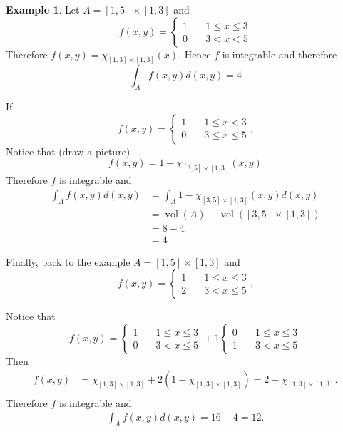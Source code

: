 \documentclass[11pt,openany]{book}
\theoremstyle{plain}
\theoremstyle{definition}
\newtheorem{example}{Example}[chapter]
\theoremstyle{remark}
\newcommand{\vol}{\operatorname{vol}}
\begin{document}
\begin{example}
    Let $A = [1, 5] \times [1,3]$ and 
    $$f(x,y) = \begin{cases}
        1 \quad & 1 \le x \le 3 \\
        0 \quad & 3 < x < 5
    \end{cases}$$
    Therefore $f(x,y) = \chi_{[1,3]\times [1,3]} (x)$.
    Hence $f$ is integrable and therefore 
    $$\int_A f(x,y) d(x,y) = 4$$

    If 
    $$f(x,y) = \begin{cases}
        1 \quad & 1 \le x < 3 \\
        0 \quad & 3 \le x \le 5
    \end{cases}.$$
    Notice that  (draw a picture)
    $$f(x,y) = 1 - \chi_{[3,5] \times [1,3]} (x,y)$$
    Therefore $f$ is integrable and 
    \begin{align*}
        \int_A f(x,y) d(x,y) &= \int_A 1 - \chi_{[3,5] \times [1,3]} (x,y) d(x,y) \\
        &=\vol (A) - \vol ([3,5] \times [1,3]) \\
        &= 8 - 4 \\
        &= 4
    \end{align*}

    Finally, back to the example $A = [1,5] \times [1,3]$ and 
    $$f(x,y) = \begin{cases}
        1 \quad & 1 \le x \le 3 \\
        2 \quad & 3 < x \le 5
    \end{cases}.$$
    
    Notice that
    $$f(x,y) = \begin{cases}
        1 \quad & 1 \le x \le 3 \\
        0 \quad & 3 < x \le 5
    \end{cases}+ 1 \begin{cases}
        0 \quad & 1 \le x \le 3 \\
        1 \quad & 3 < x \le 5
    \end{cases}$$
    Then
    \begin{align*}
        f(x,y) &= \chi_{[1,3] \times [1,3]} + 2 (1-\chi_{[1,3] \times [1,3]})=2-\chi_{[1,3] \times [1,3]}. \\
    \end{align*}
   Therefore $f$ is integrable and 
    \begin{align*}
        \int_A f(x,y) d(x,y)  =16-4=12.
    \end{align*}
\end{example}
\end{document}
